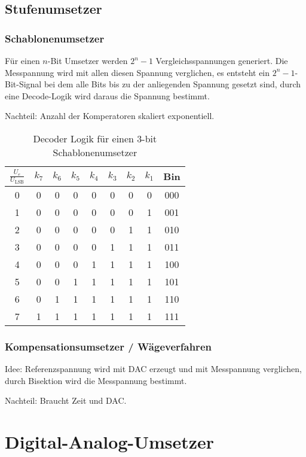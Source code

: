 \subsection{Stufenumsetzer}
\subsubsection{Schablonenumsetzer}
Für einen $n$-Bit Umsetzer werden $2^n -1$ Vergleichsspannungen generiert.
Die Messpannung wird mit allen diesen Spannung verglichen, es entsteht ein $2^n-1$-Bit-Signal bei dem alle Bits bis zu der anliegenden Spannung gesetzt sind,
durch eine Decode-Logik wird daraus die Spannung bestimmt.

Nachteil: Anzahl der Komperatoren skaliert exponentiell.

\begin{table}[H]
    \centering
    \begin{tabular}{c|ccccccc|c}
        \toprule
        $\frac{U_e}{U_\text{LSB}}$ & $k_7$ & $k_6$ & $k_5$ & $k_4$ & $k_3$ & $k_2$ & $k_1$ & Bin \\
        \midrule
        0 & 0 & 0 & 0 & 0 & 0 & 0 & 0 & 000\\
        1 & 0 & 0 & 0 & 0 & 0 & 0 & 1 & 001\\
        2 & 0 & 0 & 0 & 0 & 0 & 1 & 1 & 010\\
        3 & 0 & 0 & 0 & 0 & 1 & 1 & 1 & 011\\
        4 & 0 & 0 & 0 & 1 & 1 & 1 & 1 & 100\\
        5 & 0 & 0 & 1 & 1 & 1 & 1 & 1 & 101\\
        6 & 0 & 1 & 1 & 1 & 1 & 1 & 1 & 110\\
        7 & 1 & 1 & 1 & 1 & 1 & 1 & 1 & 111\\
        \bottomrule
    \end{tabular}
    \caption{Decoder Logik für einen 3-bit Schablonenumsetzer}
\end{table}

\subsubsection{Kompensationsumsetzer / Wägeverfahren}
Idee: Referenzspannung wird mit DAC erzeugt und mit Messpannung verglichen, durch Bisektion wird die Messpannung bestimmt.

Nachteil: Braucht Zeit und DAC.

\section{Digital-Analog-Umsetzer}

